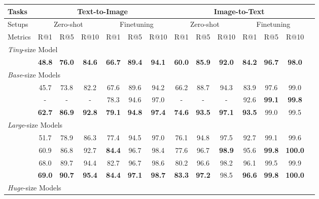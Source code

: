 \documentclass[11pt]{article}
\begin{document}
\begin{table*}[t]
\center
\small
\vskip 0.15in
\begin{adjustbox}{max width=1.\textwidth}
\begin{tabular}{@{\extracolsep{\fill}}lccccccccccccc}
\toprule
  Tasks
  &\multicolumn{6}{c}{Text-to-Image}
  &\multicolumn{6}{c}{Image-to-Text}
  \\
\midrule
  Setups
  &\multicolumn{3}{c}{Zero-shot}
  &\multicolumn{3}{c}{Finetuning}
  &\multicolumn{3}{c}{Zero-shot}
  &\multicolumn{3}{c}{Finetuning}
  \\
\midrule
  Metrics & R@1 & R@5 & R@10 & R@1 & R@5 & R@10 & R@1 & R@5 & R@10 & R@1 & R@5 & R@10
  \\
\midrule
    \multicolumn{13}{l}{\textit{Tiny}-size Model} \\
    
    & \textbf{48.8}	& \textbf{76.0}	& \textbf{84.6}	& \textbf{66.7} & \textbf{89.4} & \textbf{94.1} & \textbf{60.0}	& \textbf{85.9}	& \textbf{92.0}	& \textbf{84.2}	& \textbf{96.7}	& \textbf{98.0}
    \\
\midrule
    \multicolumn{13}{l}{\textit{Base}-size Models} \\
    
    & 45.7	& 73.8	& 82.2	& 67.6	& 89.6	& 94.2	& 66.2	& 88.7	& 94.3	& 83.9	& 97.6	& 99.0
    \\
    
    & -	& -	& -	& 78.3	& 94.6	& 97.0	& -	& -	& -	& 92.6	& \textbf{99.1}	& \textbf{99.8}
    \\
    
    & \textbf{62.7}	& \textbf{86.9}	& \textbf{92.8}	& \textbf{79.1}	& \textbf{94.8}	& \textbf{97.4}	& \textbf{74.6}	& \textbf{93.5}	& \textbf{97.1}	& \textbf{93.5}	& 99.0	& 99.5
    \\
\midrule
    \multicolumn{9}{l}{\textit{Large}-size Models} \\
    
    & 51.7	& 78.9	& 86.3	& 77.4 	& 94.5 	& 97.0	& 76.1	& 94.8	& 97.5	& 92.7 	& 99.1 	& 99.6
    \\
    
    & 60.9	& 86.8	& 92.7	& \textbf{84.4} 	& 96.7 	& 98.4	& 77.6	& 96.7	& \textbf{98.9}	& 95.6 	& \textbf{99.8}	& \textbf{100.0}
    \\
    
    & 68.0	& 89.7	& 94.4	& 82.7	& 96.7	& 98.6	& 80.2	& 96.6	& 98.2	& 96.1	& 99.5	& 99.9
    \\
    
    & \textbf{69.0}	& \textbf{90.7}	& \textbf{95.4}	& \textbf{84.4}	& \textbf{97.1}	& \textbf{98.7}	& \textbf{83.3}	& \textbf{97.2}	& 98.5	& \textbf{96.6}	& \textbf{99.8}	& \textbf{100.0}
    \\
\midrule
    \multicolumn{9}{l}{\textit{Huge}-size Models} \\
    

\end{tabular}
\end{adjustbox}
\end{table*}
\end{document}
